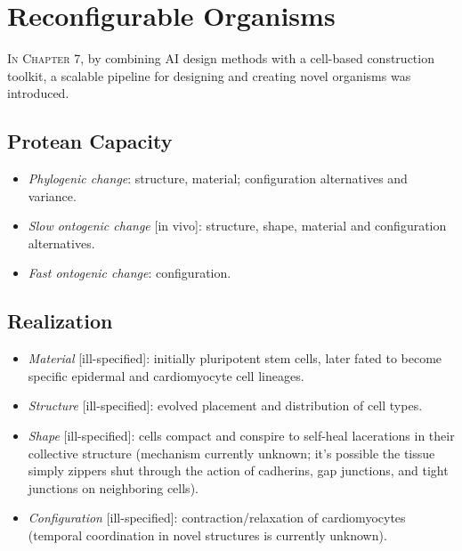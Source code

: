 



\section{Reconfigurable Organisms}


\textsc{In Chapter 7,}
by combining AI design methods with a cell-based construction toolkit, a scalable pipeline for designing and creating novel organisms was introduced.


\subsection{Protean Capacity}

\begin{itemize}
    \item \textit{Phylogenic change}: structure, material; configuration alternatives and variance.
    \item \textit{Slow ontogenic change} [in vivo]: structure, shape, material and configuration alternatives.
    \item \textit{Fast ontogenic change}: configuration.
\end{itemize}


\subsection{Realization}

\begin{itemize}
    \item \textit{Material} [ill-specified]: initially pluripotent stem cells, later fated to become specific epidermal and cardiomyocyte cell lineages.
    \item \textit{Structure} [ill-specified]: evolved placement and distribution of cell types.
    \item \textit{Shape} [ill-specified]: cells compact and conspire to self-heal lacerations in their collective structure (mechanism currently unknown; it's possible the tissue simply zippers shut through the action of cadherins, gap junctions, and tight junctions on neighboring cells).
    
    \item \textit{Configuration} [ill-specified]: contraction/relaxation of cardiomyocytes (temporal coordination in novel structures is currently unknown).
\end{itemize}


